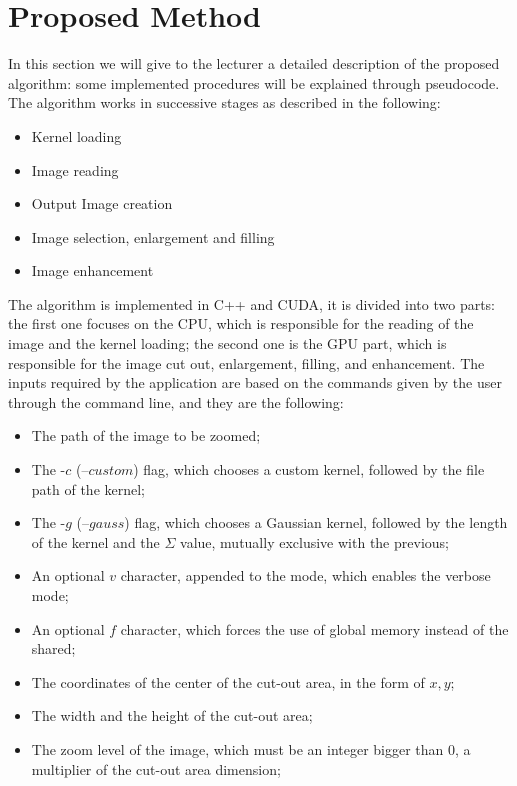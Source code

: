 \section{Proposed Method}

In this section we will give to the lecturer a detailed description of the proposed algorithm: 
some implemented procedures will be explained through pseudocode. 
The algorithm works in successive stages as described in the following:

\begin{itemize}
    \item Kernel loading
    \item Image reading
    \item Output Image creation
    \item Image selection, enlargement and filling
    \item Image enhancement
\end{itemize}

The algorithm is implemented in C++ and CUDA, it is divided into two parts: the first one focuses on the CPU, which is responsible for the reading of the image
and the kernel loading; the second one is the GPU part, which is responsible for the image cut out, enlargement, filling, and enhancement.
The inputs required by the application are based on the commands given by the user through the command line, and they are the following:
\begin{itemize}
    \item The path of the image to be zoomed;
    \item The -$c$ (--$custom$) flag, which chooses a custom kernel, followed by the file path of the kernel;
    \item The -$g$ (--$gauss$) flag, which chooses a Gaussian kernel, followed by the length of the kernel and the $\Sigma$ value, mutually exclusive with the previous;
    \item An optional $v$ character, appended to the mode, which enables the verbose mode;
    \item An optional $f$ character, which forces the use of global memory instead of the shared;
    \item The coordinates of the center of the cut-out area, in the form of $x,y$;
    \item The width and the height of the cut-out area;
    \item The zoom level of the image, which must be an integer bigger than 0, a multiplier of the cut-out area dimension;
\end{itemize}

